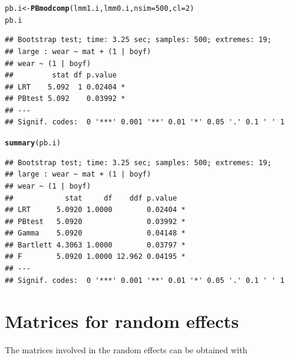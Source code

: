 \documentclass[11pt]{article}\usepackage[]{graphicx}\usepackage[]{xcolor}
\makeatletter
\newcommand{\hlnum}[1]{\textcolor[rgb]{0.686,0.059,0.569}{#1}}%
\newcommand{\hlstd}[1]{\textcolor[rgb]{0.345,0.345,0.345}{#1}}%
\newcommand{\hlkwb}[1]{\textcolor[rgb]{0.69,0.353,0.396}{#1}}%
\newcommand{\hlkwc}[1]{\textcolor[rgb]{0.333,0.667,0.333}{#1}}%
\newcommand{\hlkwd}[1]{\textcolor[rgb]{0.737,0.353,0.396}{\textbf{#1}}}%
\newenvironment{kframe}{%
 \def\at@end@of@kframe{}%
 \ifinner\ifhmode%
  \def\at@end@of@kframe{\end{minipage}}%
  \begin{minipage}{\columnwidth}%
 \fi\fi%
 \def\FrameCommand##1{\hskip\@totalleftmargin \hskip-\fboxsep
 \colorbox{shadecolor}{##1}\hskip-\fboxsep
     \hskip-\linewidth \hskip-\@totalleftmargin \hskip\columnwidth}%
 \MakeFramed {\advance\hsize-\width
   \@totalleftmargin\z@ \linewidth\hsize
   \@setminipage}}%
 {\par\unskip\endMakeFramed%
 \at@end@of@kframe}
\newenvironment{knitrout}{}{} %
\makeatother
\begin{document}
\begin{knitrout}
\color{fgcolor}\begin{kframe}
\begin{alltt}
\hlstd{pb.i} \hlkwb{<-} \hlkwd{PBmodcomp}\hlstd{(lmm1.i, lmm0.i,} \hlkwc{nsim}\hlstd{=}\hlnum{500}\hlstd{,} \hlkwc{cl}\hlstd{=}\hlnum{2}\hlstd{)}
\hlstd{pb.i}
\end{alltt}
\begin{verbatim}
## Bootstrap test; time: 3.25 sec; samples: 500; extremes: 19;
## large : wear ~ mat + (1 | boyf)
## wear ~ (1 | boyf)
##         stat df p.value  
## LRT    5.092  1 0.02404 *
## PBtest 5.092    0.03992 *
## ---
## Signif. codes:  0 '***' 0.001 '**' 0.01 '*' 0.05 '.' 0.1 ' ' 1
\end{verbatim}
\end{kframe}
\end{knitrout}

\begin{knitrout}
\color{fgcolor}\begin{kframe}
\begin{alltt}
\hlkwd{summary}\hlstd{(pb.i)}
\end{alltt}
\begin{verbatim}
## Bootstrap test; time: 3.25 sec; samples: 500; extremes: 19;
## large : wear ~ mat + (1 | boyf)
## wear ~ (1 | boyf)
##            stat     df    ddf p.value  
## LRT      5.0920 1.0000        0.02404 *
## PBtest   5.0920               0.03992 *
## Gamma    5.0920               0.04148 *
## Bartlett 4.3063 1.0000        0.03797 *
## F        5.0920 1.0000 12.962 0.04195 *
## ---
## Signif. codes:  0 '***' 0.001 '**' 0.01 '*' 0.05 '.' 0.1 ' ' 1
\end{verbatim}
\end{kframe}
\end{knitrout}


\appendix

\section{Matrices for random effects}
\label{sec:matr-rand-effects}

The matrices involved in the random effects can be obtained with
\end{document}
